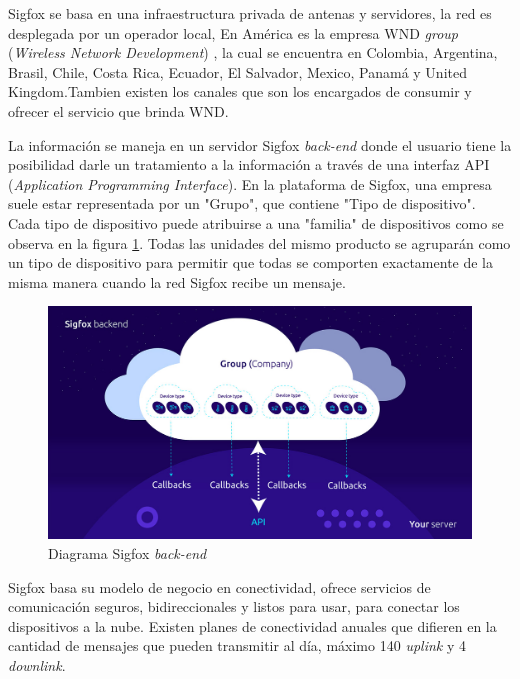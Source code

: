 Sigfox se basa en una infraestructura privada de antenas y servidores, la red es desplegada por un operador local, En América es la empresa WND \textit{group } (\textit{Wireless Network Development}) , la cual se encuentra en Colombia, Argentina, Brasil, Chile, Costa Rica, Ecuador, El Salvador, Mexico, Panamá y United Kingdom.Tambien existen los canales que son los encargados de consumir y ofrecer el servicio que brinda WND. 

La información se maneja en un servidor Sigfox  \textit{back-end} donde el usuario tiene la posibilidad darle un tratamiento a la información a través de una interfaz API (\textit{Application Programming Interface}). En la plataforma de Sigfox, una empresa suele estar representada por un "Grupo", que contiene "Tipo de dispositivo". Cada tipo de dispositivo puede atribuirse a una "familia" de dispositivos como se observa en la figura \ref{fig:backendSigfox}. Todas las unidades del mismo producto se agruparán como un tipo de dispositivo para permitir que todas se comporten exactamente de la misma manera cuando la red Sigfox recibe un mensaje. 
\begin{figure}[h]
	\centering
	\includegraphics[scale=.35]{./Figures/backendSigfox.jpg}
	\caption{Diagrama Sigfox \textit{back-end}}
	\label{fig:backendSigfox}
\end{figure}

Sigfox basa su modelo de negocio en conectividad, ofrece servicios de comunicación seguros, bidireccionales y listos para usar, para conectar los dispositivos a la nube. Existen planes de conectividad anuales que difieren en la cantidad de mensajes que pueden transmitir al día, máximo 140 \textit{uplink} y 4 \textit{downlink}.

